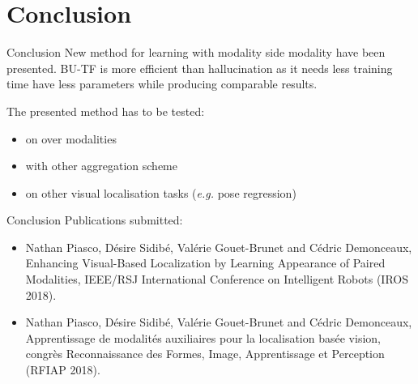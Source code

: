 \section{Conclusion}

\label{subsec:conlusion}

\begin{frame}{Conclusion}
	\vfill
	New method for learning with modality side modality have been presented. BU-TF is more efficient than hallucination as it needs less training time have less parameters while producing comparable results.
	\vfill
	\uncover<2->
	{
		The presented method has to be tested:
		\begin{itemize}
			\item<3-> on over modalities
			\item<4-> with other aggregation scheme
			\item<5-> on other visual localisation tasks (\textit{e.g.} pose regression)
		\end{itemize}
	}	
\end{frame}

\begin{frame}{Conclusion}
	Publications submitted:
	\begin{itemize}
		\item Nathan Piasco, Désire Sidibé, Valérie Gouet-Brunet and Cédric Demonceaux, Enhancing Visual-Based Localization by Learning Appearance of Paired Modalities, IEEE/RSJ International Conference on Intelligent Robots (IROS 2018).
		\item  Nathan Piasco, Désire Sidibé, Valérie Gouet-Brunet and Cédric Demonceaux, Apprentissage de modalités auxiliaires
pour la localisation basée vision, congrès Reconnaissance des Formes, Image, Apprentissage et Perception (RFIAP 2018).
	\end{itemize}
\end{frame}